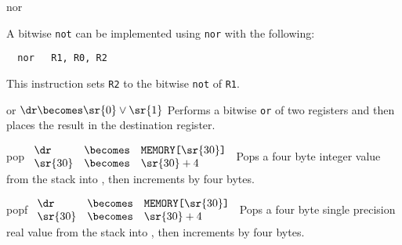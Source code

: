 \begin{instruction}{nor}

  \begin{xnote}
    A bitwise \texttt{not} can be implemented using \texttt{nor} with
    the following:

\begin{verbatim}
  nor   R1, R0, R2
\end{verbatim}

This instruction sets \texttt{R2} to the bitwise \texttt{not} of
\texttt{R1}.
  \end{xnote}

\end{instruction}


\begin{instruction}{or}
     {\roropc}
     {$\dr \becomes \sr{0} \vee \sr{1}$}
     {
       Performs a bitwise \texttt{or} of two registers and then
       places the result in the destination register.
     }
\end{instruction}


\begin{instruction}{pop}\label{inst:pop}
     {\popopc}
     {
       \begin{math}
         \begin{array}{lcl}
           \dr & \becomes & \texttt{MEMORY[\textrm{\sr{30}}]} \\
           \sr{30} & \becomes & \sr{30} + 4 \\
         \end{array}
       \end{math}
     }
     {
       Pops a four byte integer value from the stack into \dr, then
       increments  by four bytes.
     }
\end{instruction}

\begin{instruction}{popf}\label{inst:popf}
     {\popfopc}
     {
       \begin{math}
         \begin{array}{lcl}
           \dr & \becomes & \texttt{MEMORY[\textrm{\sr{30}}]} \\
           \sr{30} & \becomes & \sr{30} + 4 \\
         \end{array}
       \end{math}
     }
     {
       Pops a four byte single precision real value from the stack
       into \dr, then increments  by four bytes.
     }
\end{instruction}

